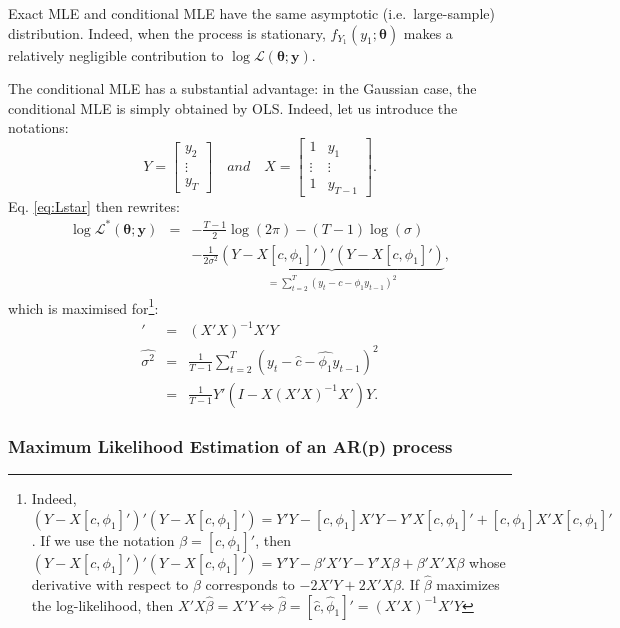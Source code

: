 \documentclass[
  11pt,
]{book}
\theoremstyle{definition}
\theoremstyle{definition}
\theoremstyle{definition}
\theoremstyle{definition}
\theoremstyle{remark}
\begin{document}
Exact MLE and conditional MLE have the same asymptotic (i.e.~large-sample) distribution. Indeed, when the process is stationary, \(f_{Y_1}(y_1;\boldsymbol\theta)\) makes a relatively negligible contribution to \(\log \mathcal{L}(\boldsymbol\theta;\mathbf{y})\).

The conditional MLE has a substantial advantage: in the Gaussian case, the conditional MLE is simply obtained by OLS. Indeed, let us introduce the notations:
\[
Y = \left[\begin{array}{c}
y_2\\
\vdots\\
y_T
\end{array}\right] \quad and \quad
X = \left[\begin{array}{cc}
1 &y_1\\
\vdots&\vdots\\
1&y_{T-1}
\end{array}\right].
\]
Eq. \eqref{eq:Lstar} then rewrites:
\begin{eqnarray}
\log \mathcal{L}^*(\boldsymbol\theta;\mathbf{y})  &=& - \frac{T-1}{2} \log(2\pi) - (T-1)\log(\sigma) \nonumber \\
&& - \frac{1}{2\sigma^2} \underbrace{(Y-X[c,\phi_1]')'(Y-X[c,\phi_1]')}_{=\displaystyle \sum_{t=2}^T (y_t-c-\phi_1 y_{t-1})^2},
\end{eqnarray}
which is maximised for\footnote{Indeed, \((Y-X[c,\phi_1]')'(Y-X[c,\phi_1]')=Y'Y-[c,\phi_1]X'Y-Y'X[c,\phi_1]'+[c,\phi_1]X'X[c,\phi_1]'\). If we use the notation \(\beta=[c,\phi_1]'\), then \((Y-X[c,\phi_1]')'(Y-X[c,\phi_1]')=Y'Y-\beta'X'Y-Y'X\beta+\beta'X'X\beta\) whose derivative with respect to \(\beta\) corresponds to \(-2X'Y+2X'X\beta\). If \(\hat{\beta}\) maximizes the log-likelihood, then \(X'X\hat{\beta}=X'Y \Leftrightarrow \hat{\beta}=[\hat{c},\hat{\phi}_1]'=(X'X)^{-1}X'Y\)}:
\begin{eqnarray}
[\hat{c},\hat\phi_1]' &=& (X'X)^{-1}X'Y \label{eq:AROLSmean} \\
\hat{\sigma^2} &=& \frac{1}{T-1} \sum_{t=2}^T (y_t - \hat{c} - \hat{\phi_1}y_{t-1})^2 \nonumber \\
&=& \frac{1}{T-1} Y'(I - X(X'X)^{-1}X')Y. \label{eq:AROLSsigma}
\end{eqnarray}

\subsubsection{Maximum Likelihood Estimation of an AR(p) process}\label{estimARp}
\end{document}
